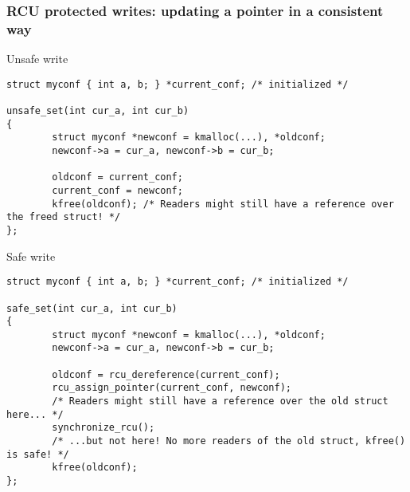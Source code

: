 \begin{frame}[fragile]
  \frametitle{RCU protected writes: updating a pointer in a consistent way}
  \begin{block}{Unsafe write}
    \begin{verbatim}
struct myconf { int a, b; } *current_conf; /* initialized */

unsafe_set(int cur_a, int cur_b)
{
        struct myconf *newconf = kmalloc(...), *oldconf;
        newconf->a = cur_a, newconf->b = cur_b;

        oldconf = current_conf;
        current_conf = newconf;
        kfree(oldconf); /* Readers might still have a reference over the freed struct! */
};
    \end{verbatim}
  \end{block}
  \begin{block}{Safe write}
    \begin{verbatim}
struct myconf { int a, b; } *current_conf; /* initialized */

safe_set(int cur_a, int cur_b)
{
        struct myconf *newconf = kmalloc(...), *oldconf;
        newconf->a = cur_a, newconf->b = cur_b;

        oldconf = rcu_dereference(current_conf);
        rcu_assign_pointer(current_conf, newconf);
        /* Readers might still have a reference over the old struct here... */
        synchronize_rcu();
        /* ...but not here! No more readers of the old struct, kfree() is safe! */
        kfree(oldconf);
};
    \end{verbatim}
  \end{block}
\end{frame}

